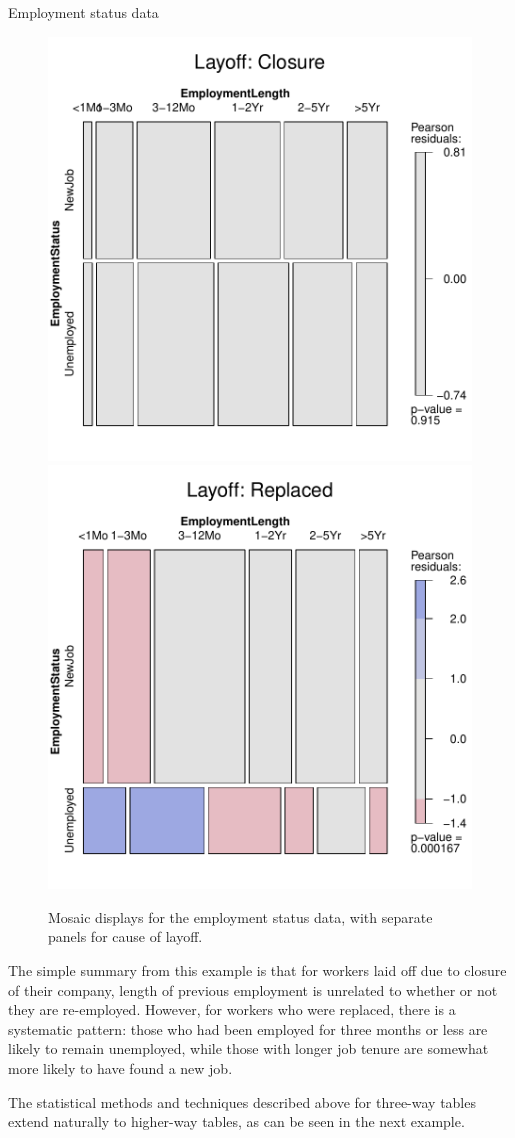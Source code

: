 \documentclass[10pt,krantz2]{krantz}\usepackage[]{graphicx}\usepackage[]{color}
\newenvironment{knitrout}{}{} %
\renewenvironment{knitrout}{\small\renewcommand{\baselinestretch}{.85}}{} %
\begin{document}
\begin{Example}[employ]{Employment status data}
\begin{knitrout}
\begin{figure}[!htbp]
\centerline{\includegraphics[width=.49\textwidth]{ch05/fig/employ-mos3-1} 
\includegraphics[width=.49\textwidth]{ch05/fig/employ-mos3-2} }

\caption[Mosaic displays for the employment status data, with separate panels for cause of layoff]{Mosaic displays for the employment status data, with separate panels for cause of layoff.}\label{fig:employ-mos3}
\end{figure}


\end{knitrout}
The simple summary from this example is that for workers laid off due to closure of
their company, length of previous employment is unrelated to whether or not they
are re-employed.  However, for workers who were replaced,
there is a systematic pattern:
those who had been employed for three months or less
are likely to remain unemployed, while those
with longer job tenure are somewhat more likely to have found a new job.
\end{Example}

The statistical methods and \R techniques described above for three-way tables
extend naturally to higher-way tables, as can be seen in the next example.
\end{document}
